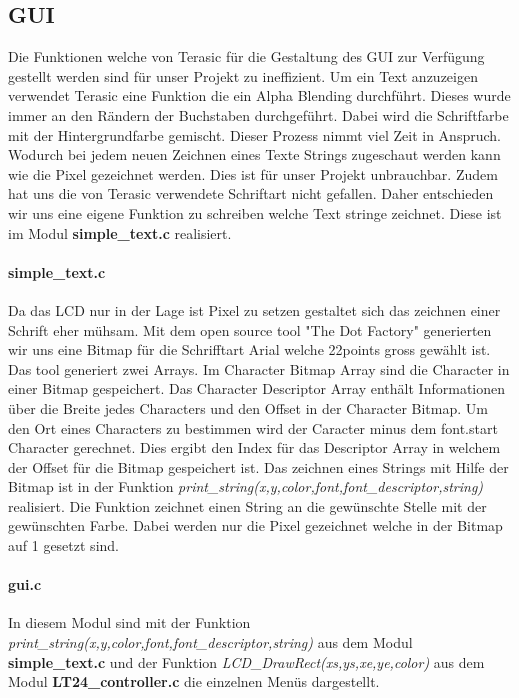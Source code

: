 \subsection{GUI}\label{subsec:gui}
Die Funktionen welche von Terasic für die Gestaltung des GUI zur Verfügung gestellt werden sind für unser Projekt zu ineffizient. Um ein Text anzuzeigen verwendet Terasic eine Funktion die ein Alpha Blending durchführt. Dieses wurde immer an den Rändern der Buchstaben durchgeführt. Dabei wird die Schriftfarbe mit der Hintergrundfarbe gemischt. Dieser Prozess nimmt viel Zeit in Anspruch. Wodurch bei jedem neuen Zeichnen eines Texte Strings zugeschaut werden kann wie die Pixel gezeichnet werden. Dies ist für unser Projekt unbrauchbar. Zudem hat uns die von Terasic verwendete Schriftart nicht gefallen. Daher entschieden wir uns eine eigene Funktion zu schreiben welche Text stringe zeichnet. Diese ist im Modul  \textbf{simple\_text.c} realisiert.

\paragraph{simple\_text.c}
Da das LCD nur in der Lage ist Pixel zu setzen gestaltet sich das zeichnen einer Schrift eher mühsam. Mit dem open source tool "The Dot Factory" generierten wir uns eine Bitmap für die Schrifftart Arial welche 22points gross gewählt ist. Das tool generiert zwei Arrays. Im Character Bitmap Array sind die Character in einer Bitmap gespeichert. Das Character Descriptor Array enthält Informationen über die Breite jedes Characters und den Offset in der Character Bitmap. Um den Ort eines Characters zu bestimmen wird der Caracter minus dem font.start Character gerechnet. Dies ergibt den Index für das Descriptor Array in welchem der Offset für die Bitmap gespeichert ist. 
Das zeichnen eines Strings mit Hilfe der Bitmap ist in der Funktion 
\textit{print\_string(x,y,color,font,font\_descriptor,string)} realisiert.
Die Funktion zeichnet einen String an die gewünschte Stelle mit der gewünschten Farbe. Dabei werden nur die Pixel gezeichnet welche in der Bitmap auf 1 gesetzt sind.
\paragraph{gui.c}
In diesem Modul sind mit der Funktion \textit{print\_string(x,y,color,font,font\_descriptor,string)} aus dem Modul  \textbf{simple\_text.c} und der Funktion \textit{LCD\_DrawRect(xs,ys,xe,ye,color)} aus dem Modul \textbf{LT24\_controller.c} die einzelnen Menüs dargestellt. 